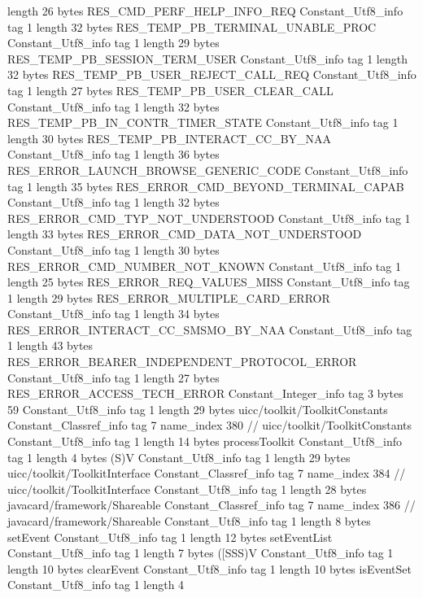{{{			length	26
			bytes	RES_CMD_PERF_HELP_INFO_REQ
		}
		Constant_Utf8_info {
			tag	1
			length	32
			bytes	RES_TEMP_PB_TERMINAL_UNABLE_PROC
		}
		Constant_Utf8_info {
			tag	1
			length	29
			bytes	RES_TEMP_PB_SESSION_TERM_USER
		}
		Constant_Utf8_info {
			tag	1
			length	32
			bytes	RES_TEMP_PB_USER_REJECT_CALL_REQ
		}
		Constant_Utf8_info {
			tag	1
			length	27
			bytes	RES_TEMP_PB_USER_CLEAR_CALL
		}
		Constant_Utf8_info {
			tag	1
			length	32
			bytes	RES_TEMP_PB_IN_CONTR_TIMER_STATE
		}
		Constant_Utf8_info {
			tag	1
			length	30
			bytes	RES_TEMP_PB_INTERACT_CC_BY_NAA
		}
		Constant_Utf8_info {
			tag	1
			length	36
			bytes	RES_ERROR_LAUNCH_BROWSE_GENERIC_CODE
		}
		Constant_Utf8_info {
			tag	1
			length	35
			bytes	RES_ERROR_CMD_BEYOND_TERMINAL_CAPAB
		}
		Constant_Utf8_info {
			tag	1
			length	32
			bytes	RES_ERROR_CMD_TYP_NOT_UNDERSTOOD
		}
		Constant_Utf8_info {
			tag	1
			length	33
			bytes	RES_ERROR_CMD_DATA_NOT_UNDERSTOOD
		}
		Constant_Utf8_info {
			tag	1
			length	30
			bytes	RES_ERROR_CMD_NUMBER_NOT_KNOWN
		}
		Constant_Utf8_info {
			tag	1
			length	25
			bytes	RES_ERROR_REQ_VALUES_MISS
		}
		Constant_Utf8_info {
			tag	1
			length	29
			bytes	RES_ERROR_MULTIPLE_CARD_ERROR
		}
		Constant_Utf8_info {
			tag	1
			length	34
			bytes	RES_ERROR_INTERACT_CC_SMSMO_BY_NAA
		}
		Constant_Utf8_info {
			tag	1
			length	43
			bytes	RES_ERROR_BEARER_INDEPENDENT_PROTOCOL_ERROR
		}
		Constant_Utf8_info {
			tag	1
			length	27
			bytes	RES_ERROR_ACCESS_TECH_ERROR
		}
		Constant_Integer_info {
			tag	3
			bytes	59
		}
		Constant_Utf8_info {
			tag	1
			length	29
			bytes	uicc/toolkit/ToolkitConstants
		}
		Constant_Classref_info {
			tag	7
			name_index	380		// uicc/toolkit/ToolkitConstants
		}
		Constant_Utf8_info {
			tag	1
			length	14
			bytes	processToolkit
		}
		Constant_Utf8_info {
			tag	1
			length	4
			bytes	(S)V
		}
		Constant_Utf8_info {
			tag	1
			length	29
			bytes	uicc/toolkit/ToolkitInterface
		}
		Constant_Classref_info {
			tag	7
			name_index	384		// uicc/toolkit/ToolkitInterface
		}
		Constant_Utf8_info {
			tag	1
			length	28
			bytes	javacard/framework/Shareable
		}
		Constant_Classref_info {
			tag	7
			name_index	386		// javacard/framework/Shareable
		}
		Constant_Utf8_info {
			tag	1
			length	8
			bytes	setEvent
		}
		Constant_Utf8_info {
			tag	1
			length	12
			bytes	setEventList
		}
		Constant_Utf8_info {
			tag	1
			length	7
			bytes	([SSS)V
		}
		Constant_Utf8_info {
			tag	1
			length	10
			bytes	clearEvent
		}
		Constant_Utf8_info {
			tag	1
			length	10
			bytes	isEventSet
		}
		Constant_Utf8_info {
			tag	1
			length	4
}}}
